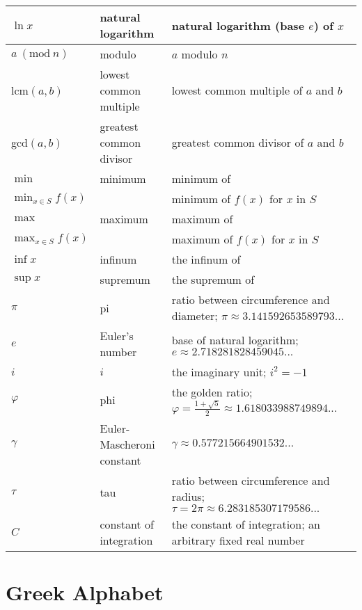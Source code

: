 \documentclass{article}
\newcommand{\Mod}[1]{\ (\text{mod}\ #1)}
\begin{document}
\begin{longtable}{|| L{1.7cm} | L{3.5cm} | L{7cm} ||}
\hline
\(\ln{x}\) & natural logarithm & natural logarithm (base \(e\)) of \(x\)\\
\hline
\(a\Mod{n}\) & modulo & \(a\) modulo \(n\)\\
\hline
lcm\((a,b)\) & lowest common multiple & lowest common multiple of \(a\) and \(b\)\\
\hline
gcd\((a,b)\) & greatest common divisor & greatest common divisor of \(a\) and \(b\)\\
\hline
\(\min\) & minimum & minimum of\\
\(\displaystyle{\min_{x\in{S}}f(x)}\) & & minimum of \(f(x)\) for \(x\) in \(S\)\\
\hline
\(\max\) & maximum & maximum of\\
\(\displaystyle{\max_{x\in{S}}f(x)}\) & & maximum of \(f(x)\) for \(x\) in \(S\)\\
\hline
\(\inf{x}\) & infinum & the infinum of\\ 
\hline
\(\sup{x}\) & supremum & the supremum of\\ 
\hline
\(\pi\) & pi & ratio between circumference and diameter; \(\pi\approx{3.141592653589793...}\)\\
\hline
\(e\) & Euler's number & base of natural logarithm; \(e\approx{2.718281828459045...}\)\\
\hline
\(i\) & \(i\) & the imaginary unit; \(i^{2}=-1\)\\
\hline
\(\varphi\) & phi & the golden ratio; \(\varphi=\frac{1+\sqrt{5}}{2}\approx{1.618033988749894...}\)\\
\hline
\(\gamma\) & Euler-Mascheroni constant & \(\gamma\approx{0.577215664901532...}\)\\
\hline
\(\tau\) & tau & ratio between circumference and radius; \(\tau=2\pi\approx{6.283185307179586...}\)\\
\hline
\(C\) & constant of integration & the constant of integration; an arbitrary fixed real number\\

\end{longtable}

\section{Greek Alphabet}

\setlength{\tabcolsep}{26pt}
\end{document}
